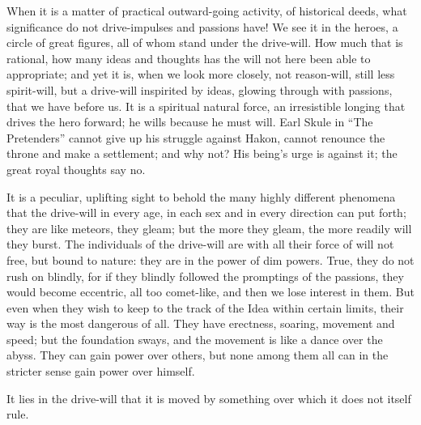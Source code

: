 \documentclass[12pt,a4paper,openany]{book}
\newcommand{\opage}[1]{\marginnote{\footnotesize\textit{[#1]}}}
\begin{document}
When it is a matter of practical outward-going activity, of
historical deeds, what significance do not drive-impulses
and passions have! We see it in the heroes, a
circle of great figures, all of whom stand under the drive-will.
How much that is rational, how many ideas and thoughts has
the will not here been able to appropriate; and yet it is,
when we look more closely, not reason-will, still less
spirit-will, but a drive-will inspirited by ideas, glowing through with passions,
that we have before us. It is a spiritual
\setcounter{footnote}{0}%
\opage{19}natural force, an irresistible longing that drives the hero forward;
he wills because he must will. Earl Skule in ``The Pretenders''
cannot give up his struggle against Hakon, cannot renounce
the throne and make a settlement; and why not? His being's
urge is against it; the great royal thoughts say no.

It is a peculiar, uplifting sight to behold the many
highly different phenomena that the drive-will in every age,
in each sex and in every direction can put forth;
they are like meteors, they gleam; but the more they gleam,
the more readily will they burst. The individuals of the drive-will are with
all their force of will not free, but bound to nature: they are in the power of
dim powers. True, they do not rush on blindly, for if they
blindly followed the promptings of the passions, they would become eccentric,
all too comet-like, and then we lose interest in them. But
even when they wish to keep to the track of the Idea within certain
limits, their way is the most dangerous of all. They have
erectness, soaring, movement and speed; but the foundation
sways, and the movement is like a dance over the abyss.
They can gain power over others, but none among them
all can in the stricter sense gain power over himself.

It lies in the drive-will that it is moved by something
over which it does not itself rule.
\end{document}
